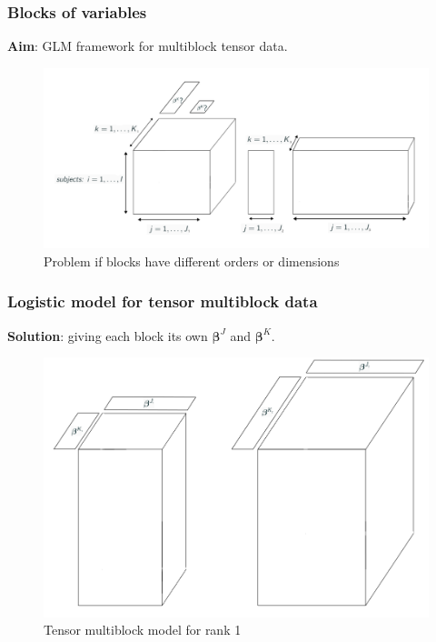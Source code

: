 \documentclass{beamer}
\begin{document}
\begin{frame}
 \frametitle{Blocks of variables}
 \textbf{Aim}: GLM framework for multiblock tensor data.\\[10 pt]

 \begin{figure}
    \centering
    \includegraphics[scale = 0.23]{images/blocks_faux.png}
    \caption{Problem if blocks have different orders or dimensions}
\end{figure}

\end{frame}


\begin{frame}
    \frametitle{Logistic model for tensor multiblock data}
    \vspace{10 pt}
    \textbf{Solution}: giving each block its own $\bm{\beta}^J$ and $\bm{\beta}^K$.\\[15 pt]
    \begin{figure}
        \centering
        \includegraphics[scale = 0.28]{images/beta_blocks.png}
        \caption{Tensor multiblock model for rank 1}
    \end{figure}
\end{frame}
\end{document}
